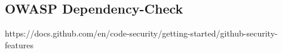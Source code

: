 \subsection{OWASP Dependency-Check} \label{sec:OWASP-Dependency-Check}
https://docs.github.com/en/code-security/getting-started/github-security-features